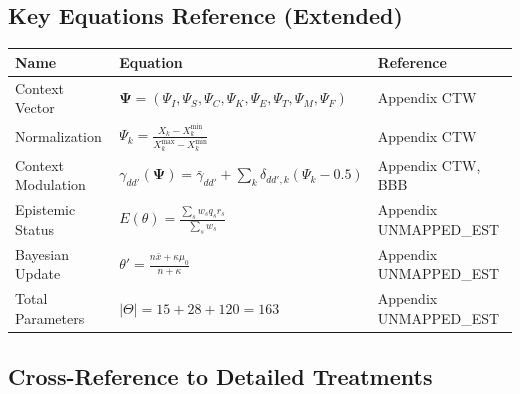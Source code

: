 \subsection{Key Equations Reference (Extended)}
\label{sec:glossary-equations-ext}

\begin{center}
\renewcommand{\arraystretch}{1.5}
\begin{tabular}{@{}lp{6cm}l@{}}
\toprule
\textbf{Name} & \textbf{Equation} & \textbf{Reference} \\
\midrule
Context Vector & $\boldsymbol{\Psi} = (\Psi_I, \Psi_S, \Psi_C, \Psi_K, \Psi_E, \Psi_T, \Psi_M, \Psi_F)$ & Appendix CTW \\
Normalization & $\Psi_k = \frac{X_k - X_k^{\min}}{X_k^{\max} - X_k^{\min}}$ & Appendix CTW \\
Context Modulation & $\gamma_{dd'}(\boldsymbol{\Psi}) = \bar{\gamma}_{dd'} + \sum_k \delta_{dd',k}(\Psi_k - 0.5)$ & Appendix CTW, BBB \\
Epistemic Status & $E(\theta) = \frac{\sum_s w_s q_s r_s}{\sum_s w_s}$ & Appendix UNMAPPED_EST \\
Bayesian Update & $\theta' = \frac{n\bar{x} + \kappa\mu_0}{n + \kappa}$ & Appendix UNMAPPED_EST \\
Total Parameters & $|\Theta| = 15 + 28 + 120 = 163$ & Appendix UNMAPPED_EST \\
\bottomrule
\end{tabular}
\end{center}



\subsection{Cross-Reference to Detailed Treatments}

